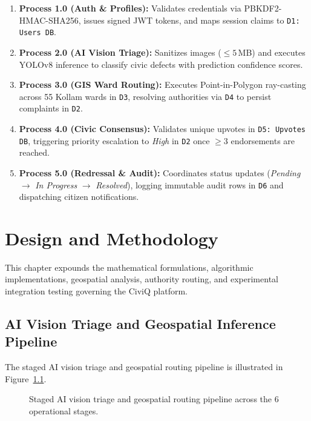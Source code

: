 \documentclass[12pt,a4paper]{report}
\begin{document}
\begin{enumerate}[1.]\setlength{\itemsep}{0.5pt}\setlength{\parsep}{0pt}\setlength{\topsep}{1pt}
    \item \textbf{Process 1.0 (Auth \& Profiles):} Validates credentials via PBKDF2-HMAC-SHA256, issues signed JWT tokens, and maps session claims to \texttt{D1: Users DB}.
    \item \textbf{Process 2.0 (AI Vision Triage):} Sanitizes images ($\le 5$\,MB) and executes YOLOv8 inference to classify civic defects with prediction confidence scores.
    \item \textbf{Process 3.0 (GIS Ward Routing):} Executes Point-in-Polygon ray-casting across 55 Kollam wards in \texttt{D3}, resolving authorities via \texttt{D4} to persist complaints in \texttt{D2}.
    \item \textbf{Process 4.0 (Civic Consensus):} Validates unique upvotes in \texttt{D5: Upvotes DB}, triggering priority escalation to \textit{High} in \texttt{D2} once $\ge 3$ endorsements are reached.
    \item \textbf{Process 5.0 (Redressal \& Audit):} Coordinates status updates (\textit{Pending} $\to$ \textit{In Progress} $\to$ \textit{Resolved}), logging immutable audit rows in \texttt{D6} and dispatching citizen notifications.
\end{enumerate}


\chapter{Design and Methodology}

This chapter expounds the mathematical formulations, algorithmic implementations, geospatial analysis, authority routing, and experimental integration testing governing the CiviQ platform.

\section{AI Vision Triage and Geospatial Inference Pipeline}
The staged AI vision triage and geospatial routing pipeline is illustrated in Figure~\ref{fig:ml_inference_flow}.

\begin{figure}[H]
    \centering
    \caption{Staged AI vision triage and geospatial routing pipeline across the 6 operational stages.}
    \label{fig:ml_inference_flow}
\end{figure}
\end{document}
